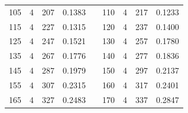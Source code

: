 \documentclass[a4paper, 12pt, french, oneside]{book}
\begin{document}
\begin{table}[!ht]
\begin{tabularx}{\linewidth}{|c|c|c|c|X|c|c|c|c|}
        105          & 4            & 207             & 0.1383                        &  &

        110          & 4            & 217             & 0.1233                                                                                                           \\

        115          & 4            & 227             & 0.1315                        &  &

        120          & 4            & 237             & 0.1400                                                                                                           \\

        125          & 4            & 247             & 0.1521                        &  &

        130          & 4            & 257             & 0.1780                                                                                                           \\

        135          & 4            & 267             & 0.1776                        &  &

        140          & 4            & 277             & 0.1836                                                                                                           \\

        145          & 4            & 287             & 0.1979                        &  &

        150          & 4            & 297             & 0.2137                                                                                                           \\

        155          & 4            & 307             & 0.2315                        &  &

        160          & 4            & 317             & 0.2401                                                                                                           \\

        165          & 4            & 327             & 0.2483                        &  &

        170          & 4            & 337             & 0.2847                                                                                                           \\


\end{tabularx}
\end{table}
\end{document}
